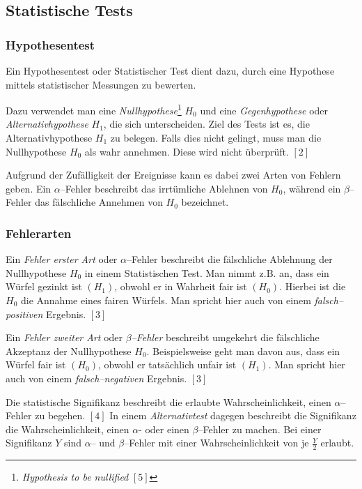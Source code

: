 \documentclass[12pt,a4paper]{scrartcl}
\numberwithin{equation}{section} %
\renewcommand{\[}{} %
\renewcommand{\]}{\noindent} %
\begin{document}
\hypertarget{statistische-tests}{%
\subsection{Statistische Tests}\label{statistische-tests}}

\hypertarget{hypothesentest}{%
\subsubsection{Hypothesentest}\label{hypothesentest}}

Ein Hypothesentest oder Statistischer Test dient dazu, durch eine Hypothese mittels statistischer Messungen zu bewerten.

Dazu verwendet man eine \emph{Nullhypothese}\footnote{\emph{Hypothesis  to be nullified} \([5]\)} \(H_0\) und eine \emph{Gegenhypothese} oder \emph{Alternativhypothese} \(H_1\), die sich unterscheiden. Ziel des Tests ist es, die Alternativhypothese \(H_1\) zu belegen. Falls dies nicht gelingt, muss man die Nullhypothese \(H_0\) als wahr annehmen. Diese wird nicht überprüft. \([2]\)

Aufgrund der Zufälligkeit der Ereignisse kann es dabei zwei Arten von Fehlern geben. Ein \(\alpha\)--Fehler beschreibt das irrtümliche Ablehnen von \(H_0\), während ein \(\beta\)--Fehler das fälschliche Annehmen von \(H_0\) bezeichnet.

\hypertarget{fehlerarten}{%
\subsubsection{Fehlerarten}\label{fehlerarten}}
Ein \emph{Fehler erster Art} oder \(\alpha\)--Fehler beschreibt die fälschliche Ablehnung der Nullhypothese \(H_0\) in einem Statistischen Test. Man nimmt z.B. an, dass ein Würfel gezinkt ist \((H_1)\), obwohl er in Wahrheit fair ist \((H_0)\). Hierbei ist die \(H_0\) die Annahme eines fairen Würfels. Man spricht hier auch von einem \emph{falsch--positiven} Ergebnis. \([3]\)

Ein \emph{Fehler zweiter Art} oder \emph{\(\beta\)--Fehler} beschreibt umgekehrt die fälschliche Akzeptanz der Nullhypothese \(H_0\). Beispielsweise geht man davon aus, dass ein Würfel fair ist \((H_0)\), obwohl er tatsächlich unfair ist \((H_1)\). Man spricht hier auch von einem \emph{falsch--negativen} Ergebnis. \([3]\)

Die statistische Signifikanz beschreibt die erlaubte Wahrscheinlichkeit, einen \(\alpha\)--Fehler zu begehen. \([4]\) In einem \emph{Alternativtest} dagegen beschreibt die Signifikanz die Wahrscheinlichkeit, einen \(\alpha\)- oder einen \(\beta\)--Fehler zu machen. Bei einer Signifikanz \(Y\) sind \(\alpha\)-- und \(\beta\)--Fehler mit einer Wahrscheinlichkeit von je \(\frac{Y}{2}\) erlaubt.
\end{document}
